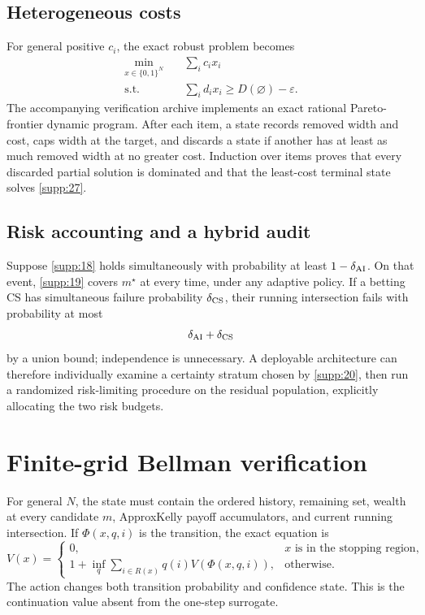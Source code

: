\documentclass[11pt]{article}
\begin{document}
\subsection{Heterogeneous costs}

For general positive \(c_i\), the exact robust problem becomes
\begin{equation}\label{supp:27}
 \begin{aligned}
 \min_{x\in\{0,1\}^N}\quad&\sum_i c_i x_i\\
 \text{s.t.}\quad&\sum_i d_i x_i
 \ge D(\varnothing)-\varepsilon.
 \end{aligned}
\end{equation}
The accompanying verification archive implements an exact rational Pareto-frontier dynamic program.
After each item, a state records removed width and cost, caps width at the
target, and discards a state if another has at least as much removed width at
no greater cost. Induction over items proves that every discarded partial
solution is dominated and that the least-cost terminal state solves \eqref{supp:27}.

\subsection{Risk accounting and a hybrid audit}

Suppose \eqref{supp:18} holds simultaneously with probability at least
\(1-\delta_{\rm AI}\). On that event, \eqref{supp:19} covers \(m^\star\) at every time,
under any adaptive policy. If a betting CS has simultaneous failure probability
\(\delta_{\rm CS}\), their running intersection fails with probability at most
\begin{equation}\label{supp:28}
 \delta_{\rm AI}+\delta_{\rm CS}
\end{equation}
by a union bound; independence is unnecessary. A deployable architecture can
therefore individually examine a certainty stratum chosen by \eqref{supp:20}, then run a
randomized risk-limiting procedure on the residual population, explicitly
allocating the two risk budgets.

\section{Finite-grid Bellman verification}

For general \(N\), the state must contain the ordered history, remaining set,
wealth at every candidate \(m\), ApproxKelly payoff accumulators, and current
running intersection. If \(\Phi(x,q,i)\) is the transition, the exact equation
is
\begin{equation}\label{supp:29}
 V(x)=
 \begin{cases}
 0,&x\text{ is in the stopping region},\\
 1+\displaystyle\inf_q\sum_{i\in R(x)}q(i)V(\Phi(x,q,i)),&\text{otherwise}.
 \end{cases}
\end{equation}
The action changes both transition probability and confidence state. This is
the continuation value absent from the one-step surrogate.
\end{document}
